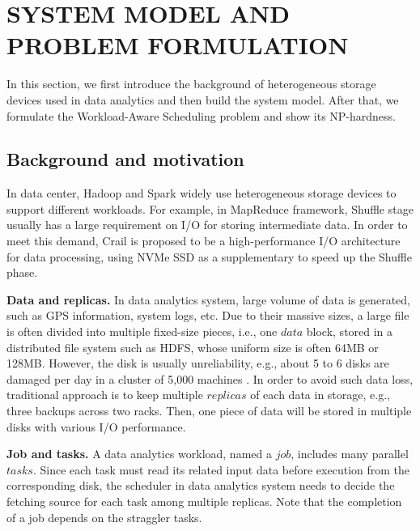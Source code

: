 \documentclass[conference]{IEEEtran}
\begin{document}
\section{SYSTEM MODEL AND PROBLEM FORMULATION}\label{SYSTEM_MODEL}
In this section, we first introduce the background of heterogeneous storage devices used in data analytics and then build the system model. After that, we formulate the Workload-Aware Scheduling problem and show its NP-hardness. 

\subsection{Background and motivation}\label{AA}

In data center, Hadoop and Spark widely use heterogeneous storage devices to support different workloads. For example, in MapReduce framework, Shuffle stage \cite{b42} \cite{b41} usually has a large requirement on I/O for storing intermediate data. In order to meet this demand, Crail \cite{b37} is proposed to be a high-performance I/O architecture for data processing, using NVMe SSD as a supplementary to speed up the Shuffle phase.

\textbf{Data and replicas.} In data analytics system, large volume of data is generated, such as GPS information\cite{b38}, system logs\cite{b39}, etc. Due to their massive sizes, a large file is often divided into multiple fixed-size pieces, i.e., one $data$ block, stored in a distributed file system such as HDFS\cite{b19}, whose uniform size is often 64MB or 128MB. However, the disk is usually unreliability, e.g., about 5 to 6 disks are damaged per day in a cluster of 5,000 machines \cite{b32}. In order to avoid such data loss, traditional approach is to keep multiple $replicas$ of each data in storage, e.g., three backups across two racks. Then, one piece of data will be stored in multiple disks with various I/O performance.

\textbf{Job and tasks.} A data analytics workload, named a $job$, includes many parallel $tasks$. Since each task must read its related input data before execution from the corresponding disk, the scheduler in data analytics system needs to decide the fetching source for each task among multiple replicas. Note that the completion of a job depends on the straggler tasks.
\end{document}
